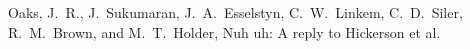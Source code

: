 \documentclass[letterpaper,12pt]{article}
\newcommand{\msTitle}{Nuh uh: A reply to Hickerson et al.
\xspace}
\begin{document}


\setcounter{figure}{0}
\setcounter{table}{0}
\setcounter{page}{1}

\singlespacing

{
\renewcommand{\refname}{\noindent\MakeUppercase{\LARGE\sffamily\upshape supporting information}}
\begin{thebibliography}{1}
\providecommand{\natexlab}[1]{#1}
\providecommand{\url}[1]{\texttt{#1}}
\providecommand{\urlprefix}{URL }

Oaks, J.~R., J.~Sukumaran, J.~A.\ Esselstyn, C.~W.\ Linkem, C.~D.\ Siler,
    R.~M.\ Brown, and M.~T.\ Holder,
\newblock \msTitle

\end{thebibliography}
}

\doublespacing


\newpage
\singlespacing


\end{document}
